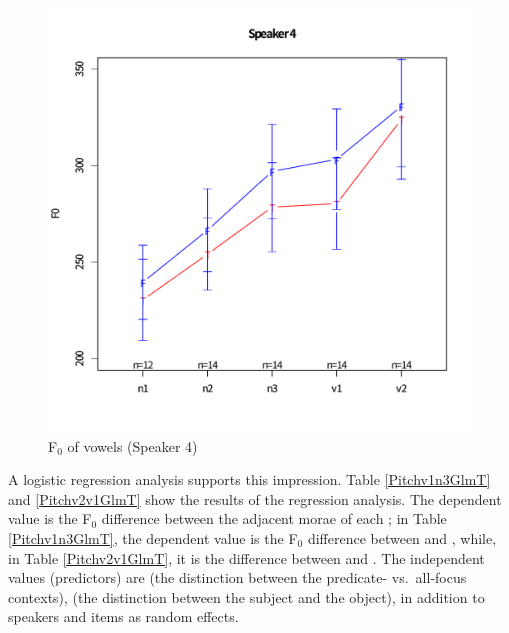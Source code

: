 \begin{figure}
	\begin{center}
	\includegraphics[width=.5\textwidth]{figure/yomiage04.pdf}
	\caption{F$_{0}$ of vowels (Speaker 4)}
	\label{Int:fig:Sp4}
	\end{center}
\end{figure}


A logistic regression analysis supports this impression.
Table \ref{Pitchv1n3GlmT} and \ref{Pitchv2v1GlmT} show the results of the regression analysis.
The dependent value is the F$_{0}$ difference between the adjacent morae of each ;
in Table \ref{Pitchv1n3GlmT}, the dependent value is the F$_{0}$ difference between  and ,
while, in Table \ref{Pitchv2v1GlmT},
it is the difference between  and .
The independent values (predictors) are  (the distinction between the predicate- vs.~all-focus contexts),
 (the distinction between the subject and the object),
in addition to speakers and items as random effects.

